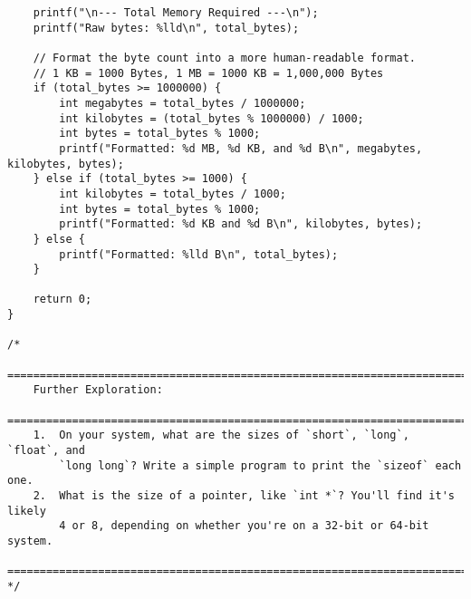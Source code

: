 \documentclass[11pt]{book}
\begin{document}
\begin{verbatim}
    printf("\n--- Total Memory Required ---\n");
    printf("Raw bytes: %lld\n", total_bytes);

    // Format the byte count into a more human-readable format.
    // 1 KB = 1000 Bytes, 1 MB = 1000 KB = 1,000,000 Bytes
    if (total_bytes >= 1000000) {
        int megabytes = total_bytes / 1000000;
        int kilobytes = (total_bytes % 1000000) / 1000;
        int bytes = total_bytes % 1000;
        printf("Formatted: %d MB, %d KB, and %d B\n", megabytes, kilobytes, bytes);
    } else if (total_bytes >= 1000) {
        int kilobytes = total_bytes / 1000;
        int bytes = total_bytes % 1000;
        printf("Formatted: %d KB and %d B\n", kilobytes, bytes);
    } else {
        printf("Formatted: %lld B\n", total_bytes);
    }

    return 0;
}

/*
    ================================================================================
    Further Exploration:
    ================================================================================
    1.  On your system, what are the sizes of `short`, `long`, `float`, and
        `long long`? Write a simple program to print the `sizeof` each one.
    2.  What is the size of a pointer, like `int *`? You'll find it's likely
        4 or 8, depending on whether you're on a 32-bit or 64-bit system.
    ================================================================================
*/

\end{verbatim}
\clearpage
\end{document}

